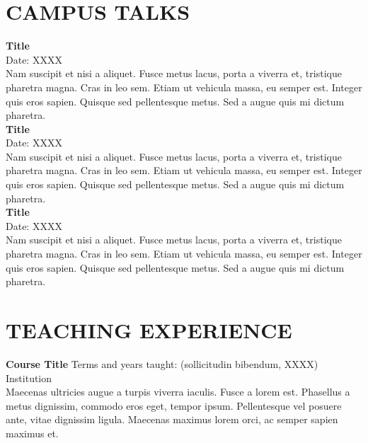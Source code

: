 \documentclass[a4paper,9pt]{extarticle}
\begin{document}

\section*{CAMPUS TALKS}

\noindent
\newline
\textbf{Title} \\
Date: XXXX \\
Nam suscipit et nisi a aliquet. Fusce metus lacus, porta a viverra et, tristique pharetra magna. Cras in leo sem. Etiam ut vehicula massa, eu semper est. Integer quis eros sapien. Quisque sed pellentesque metus. Sed a augue quis mi dictum pharetra. \\

\noindent
\textbf{Title} \\
Date: XXXX \\
Nam suscipit et nisi a aliquet. Fusce metus lacus, porta a viverra et, tristique pharetra magna. Cras in leo sem. Etiam ut vehicula massa, eu semper est. Integer quis eros sapien. Quisque sed pellentesque metus. Sed a augue quis mi dictum pharetra. \\

\noindent
\textbf{Title} \\
Date: XXXX \\
Nam suscipit et nisi a aliquet. Fusce metus lacus, porta a viverra et, tristique pharetra magna. Cras in leo sem. Etiam ut vehicula massa, eu semper est. Integer quis eros sapien. Quisque sed pellentesque metus. Sed a augue quis mi dictum pharetra. 


\section*{TEACHING EXPERIENCE}

\noindent
\newline
\textbf{Course Title} \hfill Terms and years taught: (sollicitudin bibendum, XXXX)\\
Institution\\
Maecenas ultricies augue a turpis viverra iaculis. Fusce a lorem est. Phasellus a metus dignissim, commodo eros eget, tempor ipsum. Pellentesque vel posuere ante, vitae dignissim ligula. Maecenas maximus lorem orci, ac semper sapien maximus et. \\ 
\end{document}
